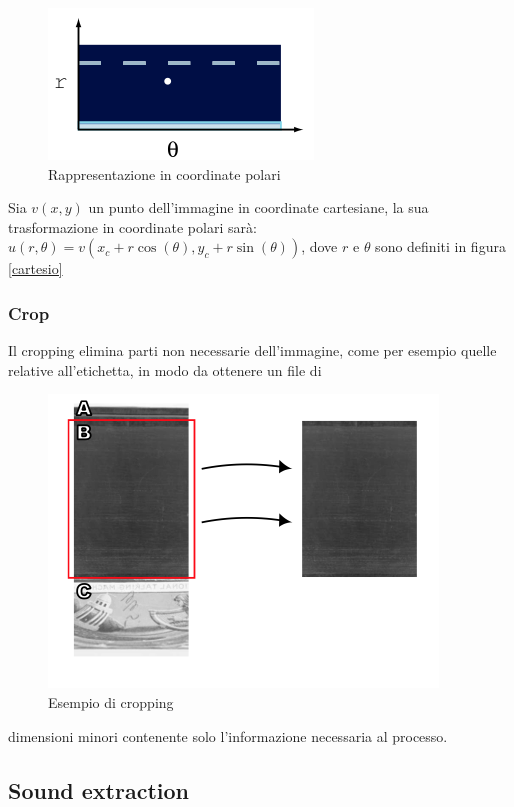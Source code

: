 \begin{figure}[h!t]
\begin{center}
\includegraphics[scale=0.5]{./img/polare.png}
\caption{Rappresentazione in coordinate polari}
\end{center}
\end{figure}
Sia $v(x,y)$ un punto dell'immagine in coordinate cartesiane, la sua trasformazione in coordinate polari sar\`a: $u(r,\theta) = v(x_c+r\cos(\theta), y_c+r\sin(\theta))$, dove $r$ e $\theta$ sono definiti in figura \ref{cartesio}
\subsubsection{Crop}
Il cropping elimina parti non necessarie dell'immagine, come per esempio quelle relative all'etichetta, in modo da ottenere un file di
\begin{figure}[h!t]
\begin{center}
\includegraphics[scale=0.6]{./img/cropping.png}
\caption{Esempio di cropping}
\end{center}
\end{figure}
 dimensioni minori contenente solo l'informazione necessaria al processo.
\subsection{Sound extraction}

